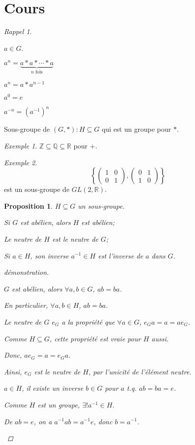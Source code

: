 \documentclass{report}
\newcounter{cours}
\newcommand*{\cours}{\section*{Cours \thecours}\stepcounter{cours}}
\newcommand*{\reels}{\mathbb{R}}
\newcommand*{\entiers}{\mathbb{Z}}
\newcommand*{\rationels}{\mathbb{Q}}
\newtheorem*{prop}{Proposition}
\theoremstyle{definition}
\theoremstyle{remark}
\newtheorem*{exem}{Exemple}
\newtheorem*{rappel}{Rappel}
\begin{document}
	\cours
	\begin{rappel}
		~

		\begin{ulist}[noitemsep]
			\item $a \in G$.
			\begin{ulist}
				\item $a^n=\underbrace{a*a*\dotsb*a}_{\text{$n$ fois}}$
				\item $a^n=a*a^{n-1}$
				\item $a^0=e$
				\item $a^{-n}=(a^{-1})^n$
			\end{ulist}
			\item Sous-groupe de $(G,*):H \subseteq G$ qui est un groupe pour $*$.
			\begin{exem}
				$\entiers \subseteq \rationels \subseteq \reels$ pour $+$.
			\end{exem}
			\begin{exem}
				\[
				\left\lbrace \begin{pmatrix}
					1&0\\0&1
				\end{pmatrix}, \begin{pmatrix}
					0&1\\1&0
				\end{pmatrix} \right\rbrace
				\]
				est un sous-groupe de $GL(2,\reels)$.
			\end{exem}
		\end{ulist}
	\end{rappel}
	\begin{prop}
		$H \subseteq G$ un sous-groupe.
		\begin{nlist}[itemsep=1pt]
			\item Si $G$ est ab\'elien, alors $H$ est ab\'elien;
			\item Le neutre de $H$ est le neutre de $G$;
			\item Si $a \in H$, son inverse $a^{-1}\in H$ est l'inverse de $a$ dans $G$.
		\end{nlist}
		\begin{proof}[d\'emonstration]~

			\begin{nlist}[itemsep=1pt]
				\item $G$ est ab\'elien, alors $\forall a,b \in G$, $ab=ba$.

				En particulier, $\forall a,b \in H$, $ab=ba$.
				\item Le neutre de $G$ $e_G$ a la propri\'et\'e que $\forall a \in G$, $e_Ga=a=ae_G$.

				Comme $H \subseteq G$, cette propri\'et\'e est vraie pour $H$ aussi.

				Donc, $ae_G=a=e_Ga$.

				Ainsi, $e_G$ est le neutre de $H$, par l'unicit\'e de l'\'el\'ement neutre.
				\item $a \in H$, il existe un inverse $b \in G$ pour $a$ t.q. $ab=ba=e$.

				Comme $H$ est un groupe, $\exists! a^{-1} \in H$.

				De $ab=e$, on a $a^{-1}ab=a^{-1}e$, donc $b=a^{-1}$.
			\end{nlist}
		\end{proof}
	\end{prop}
\end{document}
